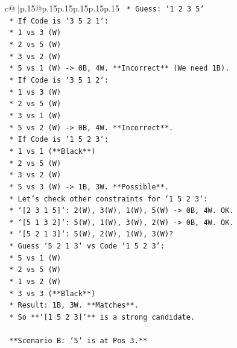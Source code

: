 \documentclass{article}
\begin{document}
{\begin{supertabular}{c@{$\;$}|p{.15\linewidth}@{}p{.15\linewidth}p{.15\linewidth}p{.15\linewidth}p{.15\linewidth}p{.15\linewidth}}
{{{\texttt{        *   Guess: `1 2 3 5`} \\
\texttt{        *   If Code is `3 5 2 1`:} \\
\texttt{            *   1 vs 3 (W)} \\
\texttt{            *   2 vs 5 (W)} \\
\texttt{            *   3 vs 2 (W)} \\
\texttt{            *   5 vs 1 (W) {-}> 0B, 4W. **Incorrect** (We need 1B).} \\
\texttt{        *   If Code is `3 5 1 2`:} \\
\texttt{            *   1 vs 3 (W)} \\
\texttt{            *   2 vs 5 (W)} \\
\texttt{            *   3 vs 1 (W)} \\
\texttt{            *   5 vs 2 (W) {-}> 0B, 4W. **Incorrect**.} \\
\texttt{        *   If Code is `1 5 2 3`:} \\
\texttt{            *   1 vs 1 (**Black**)} \\
\texttt{            *   2 vs 5 (W)} \\
\texttt{            *   3 vs 2 (W)} \\
\texttt{            *   5 vs 3 (W) {-}> 1B, 3W. **Possible**.} \\
\texttt{            *   Let's check other constraints for `1 5 2 3`:} \\
\texttt{                *   `{[}2 3 1 5{]}`: 2(W), 3(W), 1(W), 5(W) {-}> 0B, 4W. OK.} \\
\texttt{                *   `{[}5 1 3 2{]}`: 5(W), 1(W), 3(W), 2(W) {-}> 0B, 4W. OK.} \\
\texttt{                *   `{[}5 2 1 3{]}`: 5(W), 2(W), 1(W), 3(W)?} \\
\texttt{                    *   Guess `5 2 1 3` vs Code `1 5 2 3`:} \\
\texttt{                    *   5 vs 1 (W)} \\
\texttt{                    *   2 vs 5 (W)} \\
\texttt{                    *   1 vs 2 (W)} \\
\texttt{                    *   3 vs 3 (**Black**)} \\
\texttt{                    *   Result: 1B, 3W. **Matches**.} \\
\texttt{    *   So **`{[}1 5 2 3{]}`** is a strong candidate.} \\
\\ 
\texttt{    **Scenario B: `5` is at Pos 3.**} \\
}}}
\end{supertabular}}
\end{document}
